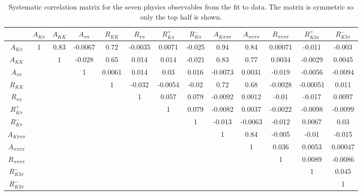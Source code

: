 \begin{table}
\centering
{\footnotesize
\begin{tabular}{c|cccccccccccc} 
\hline 
& $A_{K\pi}$ & $A_{KK}$ & $A_{\pi\pi}$ & $R_{KK}$ & $R_{\pi\pi}$ & $R^+_{K\pi}$ & $R^-_{K\pi}$ & $A_{K\pi\pi\pi}$ & $A_{\pi\pi\pi\pi}$ & $R_{\pi\pi\pi\pi}$ & $R^+_{K3\pi}$ & $R^-_{K3\pi}$ \\ 
 \hline
$A_{K\pi}$ & 1 & 0.83  & -0.0067  & 0.72  & -0.0035  & 0.0071  & -0.025  & 0.94  & 0.84  & 0.00071  & -0.011  & -0.003  \\
$A_{KK}$ &  & 1  & -0.028  & 0.65  & 0.014  & 0.014  & -0.021  & 0.83  & 0.77  & 0.0034  & -0.0029  & 0.0045  \\
$A_{\pi\pi}$ &  &  & 1  & 0.0061  & 0.014  & 0.03  & 0.016  & -0.0073  & 0.0031  & -0.019  & -0.0056  & -0.0094  \\
$R_{KK}$ & & & & 1  & -0.032  & -0.0054  & -0.02  & 0.72  & 0.68  & -0.0028  & -0.00051  & 0.011  \\
$R_{\pi\pi}$ & & & &  & 1  & 0.057  & 0.079  & -0.0092  & 0.0012  & -0.01  & -0.017  & 0.0097  \\
$R^+_{K\pi}$ & & & & &  & 1  & 0.079  & -0.0082  & 0.0037  & -0.0022  & -0.0098  & -0.0099  \\
$R^-_{K\pi}$ & & & & & &  & 1  & -0.013  & -0.0063  & -0.012  & 0.0067  & 0.03  \\
$A_{K\pi\pi\pi}$ & & & & & & &   & 1  & 0.84  & -0.005  & -0.01  & -0.015  \\
$A_{\pi\pi\pi\pi}$ & & & & & & & &   & 1  & 0.036  & 0.0053  & 0.00047  \\
$R_{\pi\pi\pi\pi}$ & & & & & & & & &   & 1  & 0.0089  & -0.0086  \\
$R^-_{K3\pi}$ & & & & & & & & & &   & 1  & 0.045  \\
$R^-_{K3\pi}$ & & & & & & & & & & &   & 1  \\
\hline 
\end{tabular}}
\caption{Systematic correlation matrix for the seven physics observables from the \CP fit to data. The matrix is symmetric so only the top half is shown.}
\label{systematiccorrelations}
\end{table}


\clearpage

